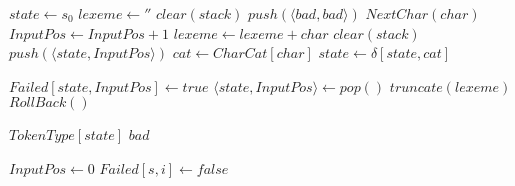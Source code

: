 \documentclass[varwidth=\maxdimen]{standalone}
\begin{document}
\begin{algorithmic}[1] %
    \State $state \gets s_0$
    \State $lexeme \gets ''$
    \State $clear(stack)$
    \State $push(\langle bad, bad\rangle)$
      \State $NextChar(char)$
      \State $InputPos \gets InputPos+1$
      \State $lexeme \gets lexeme+char$
        \Break
      \EndIf
        \State $clear(stack)$
      \EndIf
      \State $push(\langle state, InputPos\rangle)$
      \State $cat \gets CharCat[char]$
      \State $state \gets \delta[state,cat]$
    \EndWhile
    
      \State $Failed[state,InputPos] \gets true$
      \State $\langle state, InputPos\rangle \gets pop()$
      \State $truncate(lexeme)$
      \State $RollBack()$
    \EndWhile

      \StateReturn $TokenType[state]$
    \Else
      \StateReturn $bad$
    \EndIf
    
  \EndProcedure

    \State $InputPos \gets 0$
        \State $Failed[s,i] \gets false$
      \EndFor
    \EndFor
  \EndProcedure
\end{algorithmic}
\end{document}
